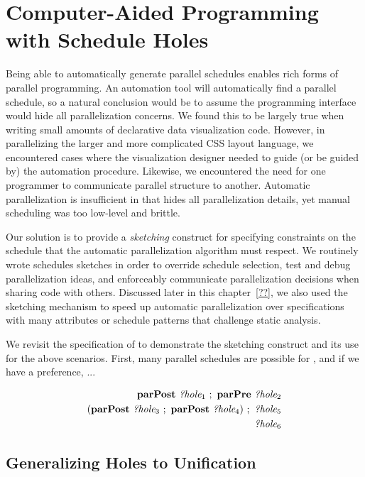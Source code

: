 \section{Computer-Aided Programming with Schedule Holes}
\label{sec:holes}
Being able to automatically generate parallel schedules enables rich forms of parallel programming. An automation tool will automatically find a parallel schedule, so a natural conclusion would be to assume the programming interface would hide all parallelization concerns. We found this to be largely true when writing small amounts of declarative data visualization code. However, in parallelizing the larger and more complicated CSS layout language, we encountered cases where the visualization designer needed to guide (or be guided by) the automation procedure. Likewise, we encountered the need for one programmer to communicate parallel structure to another. Automatic parallelization is insufficient in that hides all parallelization details, yet manual scheduling was too low-level and brittle.

Our solution is to provide a \emph{sketching} construct for specifying constraints on the schedule that the automatic parallelization algorithm must respect. We routinely wrote schedules sketches in order to override schedule selection, test and debug parallelization ideas, and enforceably communicate parallelization decisions when sharing code with others. Discussed later in this chapter~\ref{??}, we also used the sketching mechanism to speed up automatic parallelization over specifications with many attributes or schedule patterns that challenge static analysis.

We revisit the specification of \hlang{} to demonstrate the sketching construct and its use for the above scenarios. First, many parallel schedules are possible for \hlang{}, and if we  have a preference, ...

\begin{align}
\text{\textbf{parPost}} ~ {\emph{?hole}}_1 ~ ; ~ \text{\textbf{parPre}} ~ {\emph{?hole}}_2 \\
(\text{\textbf{parPost}} ~ {\emph{?hole}}_3 ~ ; ~ \text{\textbf{parPost}} ~ {\emph{?hole}}_4) ~ ; ~ {\emph{?hole}}_5 \\
{\emph{?hole}}_6
\end{align}






\subsection{Generalizing Holes to Unification}

